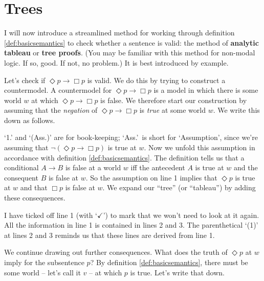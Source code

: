 \section{Trees}\label{sec:trees}

I will now introduce a streamlined method for working through definition
\ref{def:basicsemantics} to check whether a sentence is valid: the method of
\textbf{analytic tableau} or \textbf{tree proofs}. (You may be familiar with
this method for non-modal logic. If so, good. If not, no problem.) It is best
introduced by example.

Let's check if $\Diamond p \to \Box p$ is valid. We do this by trying to
construct a countermodel. A countermodel for $\Diamond p \to \Box p$ is a model
in which there is some world $w$ at which $\Diamond p\to \Box p$ is false. We
therefore start our construction by assuming that the \emph{negation} of
$\Diamond p \to \Box p$ is \emph{true} at some world $w$. We write this down as
follows.

\begin{center}
\end{center}
%
`1.' and `(Ass.)' are for book-keeping; `Ass.'\ is short for `Assumption', since
we're assuming that $\neg(\Diamond p \to \Box p)$ is true at $w$. Now we
unfold this assumption in accordance with definition \ref{def:basicsemantics}.
The definition tells us that a conditional $A\to B$ is false at a world $w$ iff
the antecedent $A$ is true at $w$ and the consequent $B$ is false at $w$. So the
assumption on line 1 implies that $\Diamond p$ is true at $w$ and that $\Box p$
is false at $w$. We expand our ``tree'' (or ``tableau'') by adding these consequences.

\begin{center}
\end{center}
%
I have ticked off line 1 (with `$\checkmark$') to mark that we won't need to
look at it again. All the information in line 1 is contained in lines 2 and 3.
The parenthetical `(1)' at lines 2 and 3 reminds us that these lines are
derived from line 1.

We continue drawing out further consequences. What does the truth of
$\Diamond p$ at $w$ imply for the subsentence $p$? By definition
\ref{def:basicsemantics}, there must be some world -- let's call it $v$ -- at
which $p$ is true. Let's write that down.

